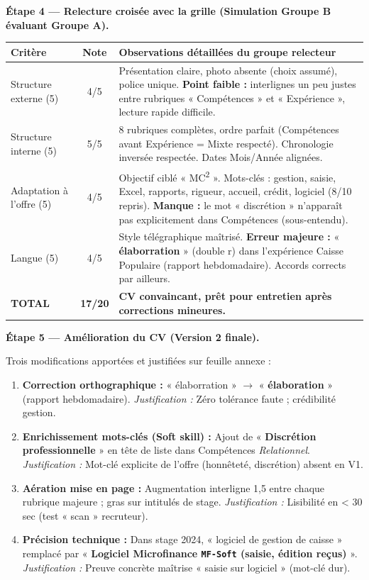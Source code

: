 \documentclass[11pt]{article}
\newcommand{\cle}[1]{{\popxbold\color{popdark}#1}}
\begin{document}
\begin{exoresolu}
\textbf{Étape 4 — Relecture croisée avec la grille (Simulation Groupe B évaluant Groupe A).}

\begin{center}
\begin{tabularx}{\linewidth}{|l|c|X|}\hline
\rowcolor{popblueL} \textbf{Critère} & \textbf{Note} & \textbf{Observations détaillées du groupe relecteur} \\ \hline
Structure externe (5) & 4/5 & Présentation claire, photo absente (choix assumé), police unique. \textbf{Point faible :} interlignes un peu justes entre rubriques « Compétences » et « Expérience », lecture rapide difficile. \\ \hline
Structure interne (5) & 5/5 & 8 rubriques complètes, ordre parfait (Compétences avant Expérience = Mixte respecté). Chronologie inversée respectée. Dates Mois/Année alignées. \\ \hline
Adaptation à l'offre (5) & 4/5 & Objectif ciblé « MC\textsuperscript{2} ». Mots-clés : \cle{gestion}, \cle{saisie}, \cle{Excel}, \cle{rapports}, \cle{rigueur}, \cle{accueil}, \cle{crédit}, \cle{logiciel} (8/10 repris). \textbf{Manque :} le mot « discrétion » n'apparaît pas explicitement dans Compétences (sous-entendu). \\ \hline
Langue (5) & 4/5 & Style télégraphique maîtrisé. \textbf{Erreur majeure :} « \textbf{élaborration} » (double r) dans l'expérience Caisse Populaire (rapport hebdomadaire). Accords corrects par ailleurs. \\ \hline
\textbf{TOTAL} & \textbf{17/20} & \textbf{CV convaincant, prêt pour entretien après corrections mineures.} \\ \hline
\end{tabularx}
\end{center}

\textbf{Étape 5 — Amélioration du CV (Version 2 finale).}

Trois modifications apportées et justifiées sur feuille annexe :
\begin{enumerate}
\item \textbf{Correction orthographique :} « élaborration » $\rightarrow$ « \textbf{élaboration} » (rapport hebdomadaire). \textit{Justification :} Zéro tolérance faute ; crédibilité gestion.
\item \textbf{Enrichissement mots-clés (Soft skill) :} Ajout de « \textbf{Discrétion professionnelle} » en tête de liste dans Compétences \textit{Relationnel}. \textit{Justification :} Mot-clé explicite de l'offre (honnêteté, discrétion) absent en V1.
\item \textbf{Aération mise en page :} Augmentation interligne 1,5 entre chaque rubrique majeure ; gras sur intitulés de stage. \textit{Justification :} Lisibilité en < 30 sec (test « scan » recruteur).
\item \textbf{Précision technique :} Dans stage 2024, « logiciel de gestion de caisse » remplacé par « \textbf{Logiciel Microfinance \texttt{MF-Soft} (saisie, édition reçus)} ». \textit{Justification :} Preuve concrète maîtrise « saisie sur logiciel » (mot-clé dur).
\end{enumerate}


\end{exoresolu}
\end{document}

